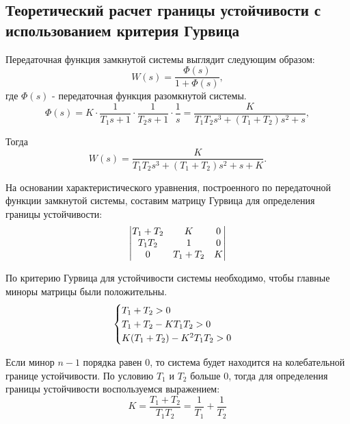 \documentclass[a4paper,12pt]{article} %
\begin{document}
\newpage
\begin{center}
    \section{Теоретический расчет границы устойчивости с использованием критерия Гурвица}
\end{center}
 
 
Передаточная функция замкнутой системы выглядит следующим образом:
\begin{equation} W(s) = \frac{\Phi(s)}{1 + \Phi(s)}, \end{equation}
где $\Phi(s)$ - передаточная функция разомкнутой системы.
\begin{equation} 
\Phi(s) = K\cdot\frac{1}{T_1s + 1}\cdot\frac{1}{T_2s + 1}\cdot\frac{1}{s} = \frac{K}{T_1T_2s^3 + (T_1 + T_2)s^2 +s},
\end{equation}
\par
Тогда \begin{equation} W(s) = \frac{K}{T_1T_2s^3 + (T_1 + T_2)s^2 +s + K}. \end{equation}
\par
На основании характеристического уравнения, построенного по передаточной функции замкнутой системы, составим матрицу Гурвица для определения границы устойчивости:
\[
\begin{vmatrix}
$$T_1 + T_2$$ & $$K$$ & 0\\
$$T_1T_2$$ & 1 & 0\\
0 & $$T_1 + T_2$$ & $$K$$
\end{vmatrix}
\]
\par
По критерию Гурвица для устойчивости системы необходимо, чтобы главные миноры матрицы были положительны. 
\begin{equation}
    \begin{cases}
        $$T_1 + T_2 > 0$$\\
        $$T_1 + T_2 - KT_1T_2 > 0$$\\
        $$K(T_1 + T_2) - K^2T_1T_2 > 0$$
    \end{cases}
\end{equation}
\par
Если минор $n - 1$ порядка равен 0, то система будет находится на колебательной границе устойчивости. По условию $T_1$ и $T_2$ больше 0, тогда для определения границы устойчивости воспользуемся выражением:
\begin{equation}
    K = \frac{T_1 + T_2}{T_1T_2} =  \frac{1}{T_1} + \frac{1}{T_2}
\end{equation}
    
\end{document}
